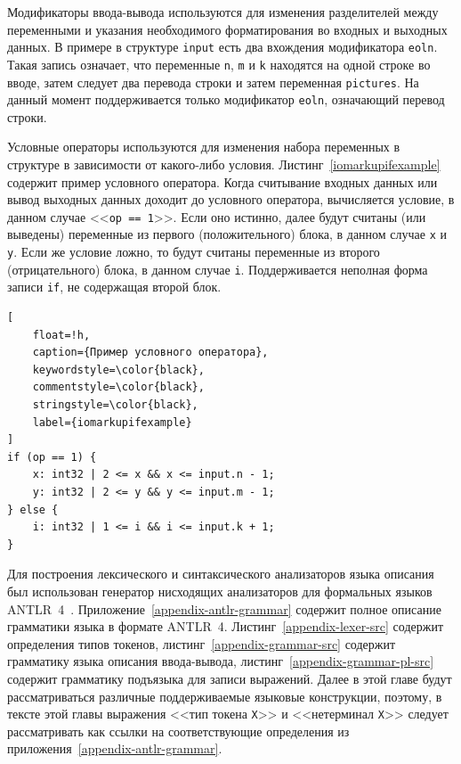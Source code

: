 \documentclass[times,specification,annotation]{style/itmo-student-thesis/itmo-student-thesis}
\begin{document}
Модификаторы ввода-вывода используются для изменения разделителей между переменными и указания необходимого форматирования во входных и выходных данных. В примере в структуре \texttt{input} есть два вхождения модификатора \texttt{eoln}. Такая запись означает, что переменные \texttt{n}, \texttt{m} и \texttt{k} находятся на одной строке во вводе, затем следует два перевода строки и затем переменная \texttt{pictures}. На данный момент поддерживается только модификатор \texttt{eoln}, означающий перевод строки.

Условные операторы используются для изменения набора переменных в структуре в зависимости от какого-либо условия. Листинг~\ref{iomarkupifexample} содержит пример условного оператора. Когда считывание входных данных или вывод выходных данных доходит до условного оператора, вычисляется условие, в данном случае <<\texttt{op~==~1}>>. Если оно истинно, далее будут считаны (или выведены) переменные из первого (положительного) блока, в данном случае \texttt{x} и \texttt{y}. Если же условие ложно, то будут считаны переменные из второго (отрицательного) блока, в данном случае \texttt{i}. Поддерживается неполная форма записи \texttt{if}, не содержащая второй блок.

\begin{lstlisting}[
    float=!h,
    caption={Пример условного оператора},
    keywordstyle=\color{black},
    commentstyle=\color{black},
    stringstyle=\color{black},
    label={iomarkupifexample}
]
if (op == 1) {
    x: int32 | 2 <= x && x <= input.n - 1;
    y: int32 | 2 <= y && y <= input.m - 1;
} else {
    i: int32 | 1 <= i && i <= input.k + 1;
}
\end{lstlisting}

Для построения лексического и синтаксического анализаторов языка описания был использован генератор нисходящих анализаторов для формальных языков ANTLR~4~\cite{parr2013definitive}. Приложение~\ref{appendix-antlr-grammar} содержит полное описание грамматики языка в формате ANTLR~4. Листинг~\ref{appendix-lexer-src} содержит определения типов токенов, листинг~\ref{appendix-grammar-src} содержит грамматику языка описания ввода-вывода, листинг~\ref{appendix-grammar-pl-src} содержит грамматику подъязыка для записи выражений. Далее в этой главе будут рассматриваться различные поддерживаемые языковые конструкции, поэтому, в тексте этой главы выражения <<тип токена \texttt{X}>> и <<нетерминал \texttt{X}>> следует рассматривать как ссылки на соответствующие определения из приложения~\ref{appendix-antlr-grammar}.
\end{document}
